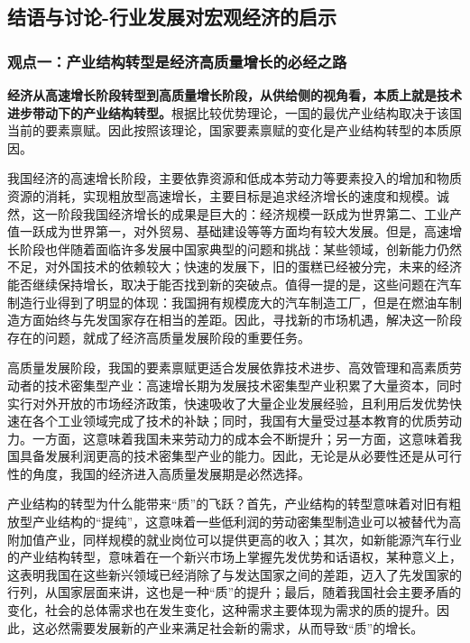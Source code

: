 \documentclass[a4paper, 10pt]{article}
\begin{document}
\subsection{结语与讨论-行业发展对宏观经济的启示}


  \subsubsection{观点一：产业结构转型是经济高质量增长的必经之路}
\textbf{经济从高速增长阶段转型到高质量增长阶段，从供给侧的视角看，本质上就是技术进步带动下的产业结构转型。}根据比较优势理论，一国的最优产业结构取决于该国当前的要素禀赋。因此按照该理论，国家要素禀赋的变化是产业结构转型的本质原因。

我国经济的高速增长阶段，主要依靠资源和低成本劳动力等要素投入的增加和物质资源的消耗，实现粗放型高速增长，主要目标是追求经济增长的速度和规模。诚然，这一阶段我国经济增长的成果是巨大的：经济规模一跃成为世界第二、工业产值一跃成为世界第一，对外贸易、基础建设等等方面均有较大发展。但是，高速增长阶段也伴随着面临许多发展中国家典型的问题和挑战：某些领域，创新能力仍然不足，对外国技术的依赖较大；快速的发展下，旧的蛋糕已经被分完，未来的经济能否继续保持增长，取决于能否找到新的突破点。值得一提的是，这些问题在汽车制造行业得到了明显的体现：我国拥有规模庞大的汽车制造工厂，但是在燃油车制造方面始终与先发国家存在相当的差距。因此，寻找新的市场机遇，解决这一阶段存在的问题，就成了经济高质量发展阶段的重要任务。

高质量发展阶段，我国的要素禀赋更适合发展依靠技术进步、高效管理和高素质劳动者的技术密集型产业：高速增长期为发展技术密集型产业积累了大量资本，同时实行对外开放的市场经济政策，快速吸收了大量企业发展经验，且利用后发优势快速在各个工业领域完成了技术的补缺；同时，我国有大量受过基本教育的优质劳动力。一方面，这意味着我国未来劳动力的成本会不断提升；另一方面，这意味着我国具备发展利润更高的技术密集型产业的能力。因此，无论是从必要性还是从可行性的角度，我国的经济进入高质量发展期是必然选择。

产业结构的转型为什么能带来“质”的飞跃？首先，产业结构的转型意味着对旧有粗放型产业结构的“提纯”，这意味着一些低利润的劳动密集型制造业可以被替代为高附加值产业，同样规模的就业岗位可以提供更高的收入；其次，如新能源汽车行业的产业结构转型，意味着在一个新兴市场上掌握先发优势和话语权，某种意义上，这表明我国在这些新兴领域已经消除了与发达国家之间的差距，迈入了先发国家的行列，从国家层面来讲，这也是一种“质”的提升；最后，随着我国社会主要矛盾的变化，社会的总体需求也在发生变化，这种需求主要体现为需求的质的提升。因此，这必然需要发展新的产业来满足社会新的需求，从而导致“质”的增长。
\end{document}
